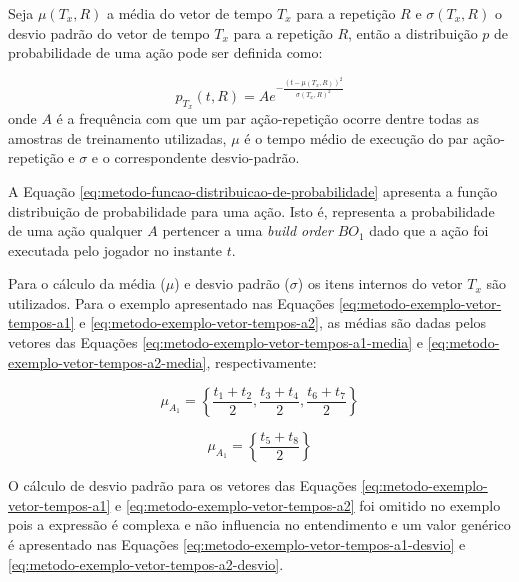 Seja $\mu(T_x, R)$ a média do vetor de tempo $T_x$ para a repetição $R$ e $\sigma(T_x, R)$ o desvio padrão do vetor de tempo $T_x$ para a repetição $R$, então a distribuição $p$ de probabilidade de uma ação pode ser definida como:

\begin{equation}
	p_{T_x}(t, R) = A e^{-\frac{(t-\mu(T_x, R))^2}{{\sigma(T_x, R)}^2}}
	\label{eq:metodo-funcao-distribuicao-de-probabilidade}
\end{equation}
\noindent onde $A$ é a frequência com que um par ação-repetição ocorre dentre todas as amostras de treinamento utilizadas, $\mu$ é o tempo médio de execução do par ação-repetição e $\sigma$ e o correspondente desvio-padrão.

A Equação \ref{eq:metodo-funcao-distribuicao-de-probabilidade} apresenta a função distribuição de probabilidade para uma ação. Isto é, representa a probabilidade de uma ação qualquer $A$ pertencer a uma \textit{build order} $BO_1$ dado que a ação foi executada pelo jogador no instante $t$.


Para o cálculo da média ($\mu$) e desvio padrão ($\sigma$) os itens internos do vetor $T_x$ são utilizados. Para o exemplo apresentado nas Equações \ref{eq:metodo-exemplo-vetor-tempos-a1} e \ref{eq:metodo-exemplo-vetor-tempos-a2}, as médias são dadas pelos vetores das Equações \ref{eq:metodo-exemplo-vetor-tempos-a1-media} e \ref{eq:metodo-exemplo-vetor-tempos-a2-media}, respectivamente:

\begin{equation}
    \mu_{A_1} = \left\{
		\frac{t_1 + t_2}{2}, 
		\frac{t_3 + t_4}{2}, 		
		\frac{t_6 + t_7}{2}
	\right\}
	\label{eq:metodo-exemplo-vetor-tempos-a1-media}
\end{equation}

\begin{equation}
    \mu_{A_1} = \left\{
		\frac{t_5 + t_8}{2}
	\right\}
	\label{eq:metodo-exemplo-vetor-tempos-a2-media}
\end{equation}

O cálculo de desvio padrão para os vetores das Equações \ref{eq:metodo-exemplo-vetor-tempos-a1} e \ref{eq:metodo-exemplo-vetor-tempos-a2} foi omitido no exemplo pois a expressão é complexa e não influencia no entendimento e um valor genérico é apresentado nas Equações \ref{eq:metodo-exemplo-vetor-tempos-a1-desvio} e \ref{eq:metodo-exemplo-vetor-tempos-a2-desvio}.

